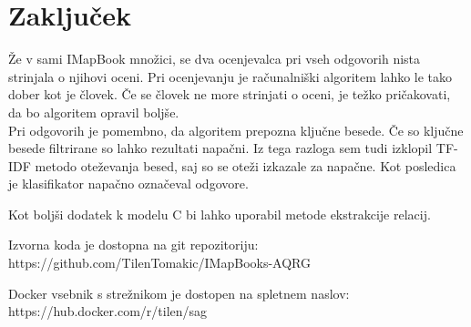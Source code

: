 \documentclass[journal]{IEEEtran}
\begin{document}
\section{Zaključek}
Že v sami IMapBook množici, se dva ocenjevalca pri vseh odgovorih nista strinjala o njihovi oceni. Pri ocenjevanju je računalniški algoritem lahko le tako dober kot je človek. Če se človek ne more strinjati o oceni, je težko pričakovati, da bo algoritem opravil boljše.\\

Pri odgovorih je pomembno, da algoritem prepozna ključne besede. Če so ključne besede filtrirane so lahko rezultati napačni. Iz tega razloga sem tudi izklopil TF-IDF metodo oteževanja besed, saj so se oteži izkazale za napačne. Kot posledica je klasifikator napačno označeval odgovore.

Kot boljši dodatek k modelu C bi lahko uporabil metode ekstrakcije relacij.

Izvorna koda je dostopna na git repozitoriju: https://github.com/TilenTomakic/IMapBooks-AQRG

Docker vsebnik s strežnikom je dostopen na spletnem naslov:
https://hub.docker.com/r/tilen/sag

\ifCLASSOPTIONcaptionsoff
  \newpage
\fi



\end{document}

